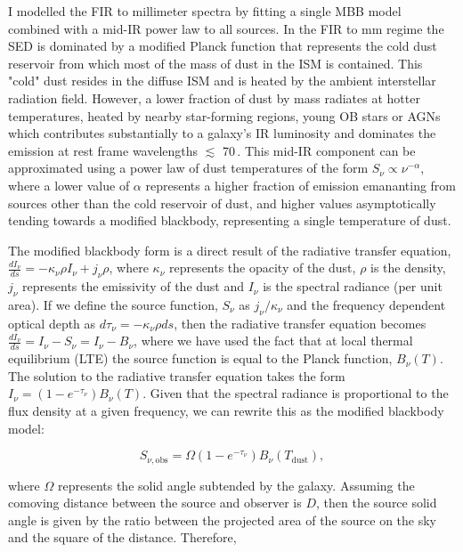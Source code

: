 I modelled the FIR to millimeter spectra by fitting a single MBB model combined with a mid-IR power law to all sources. In the FIR to mm regime the SED is dominated by a modified Planck function that represents the cold dust reservoir from which most of the mass of dust in the ISM is contained. This "cold" dust resides in the diffuse ISM and is heated by the ambient interstellar radiation field. However, a lower fraction of dust by mass radiates at hotter temperatures, heated by nearby star-forming regions, young OB stars or AGNs which contributes substantially to a galaxy's IR luminosity and dominates the emission at rest frame wavelengths $\lesssim$ 70\,\micron. This mid-IR component can be approximated using a power law of dust temperatures of the form $S_\nu \propto \nu^{-\alpha}$, where a lower value of $\alpha$ represents a higher fraction of emission emananting from sources other than the cold reservoir of dust, and higher values asymptotically tending towards a modified blackbody, representing a single temperature of dust.

The modified blackbody form is a direct result of the radiative transfer equation, $\frac{dI_\nu}{ds} = -\kappa_\nu \rho I_\nu + j_\nu \rho$, where $\kappa_\nu$ represents the opacity of the dust, $\rho$ is the density, $j_\nu$ represents the emissivity of the dust and $I_\nu$ is the spectral radiance (per unit area). If we define the source function, $S_\nu$ as $j_\nu/\kappa_\nu$ and the frequency dependent optical depth as $d\tau_\nu = -\kappa_\nu \rho ds$, then the radiative transfer equation becomes $\frac{dI_\nu}{ds} = I_\nu - S_\nu = I_\nu - B_\nu$, where we have used the fact that at local thermal equilibrium (LTE) the source function is equal to the Planck function, $B_\nu(T)$. The solution to the radiative transfer equation takes the form $I_\nu = (1 - e^{-\tau_\nu}) B_\nu(T)$. Given that the spectral radiance is proportional to the flux density at a given frequency, we can rewrite this as the modified blackbody model:

\begin{equation}
	S_{\nu, \textrm{obs}} = \Omega(1 - e^{-\tau_\nu}) B_\nu(T_{\textrm{dust}}),
\label{eq:modified_blackbody_omega}
\end{equation}

where $\Omega$ represents the solid angle subtended by the galaxy. Assuming the comoving distance between the source and observer is $D$, then the source solid angle is given by the ratio between the projected area of the source on the sky and the square of the distance. Therefore,


